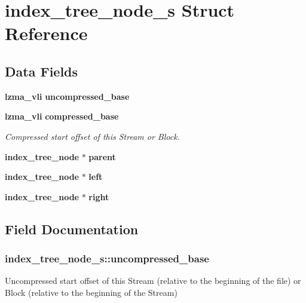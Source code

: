 \section{index\-\_\-tree\-\_\-node\-\_\-s Struct Reference}
\label{structindex__tree__node__s}
\subsection*{Data Fields}
\begin{DoxyCompactItemize}
\item 
{\bf lzma\-\_\-vli} {\bf uncompressed\-\_\-base}
\item 
{\bf lzma\-\_\-vli} {\bf compressed\-\_\-base}
\begin{DoxyCompactList}\small\item\em Compressed start offset of this Stream or Block. \end{DoxyCompactList}\item 
{\bf index\-\_\-tree\-\_\-node} $\ast$ {\bfseries parent}\label{structindex__tree__node__s_a6d682099a97742fde2b70dbb4043b943}

\item 
{\bf index\-\_\-tree\-\_\-node} $\ast$ {\bfseries left}\label{structindex__tree__node__s_a638db95808d3748f92226352c7a62435}

\item 
{\bf index\-\_\-tree\-\_\-node} $\ast$ {\bfseries right}\label{structindex__tree__node__s_a481731822e8073ba8db151e7baa101cc}

\end{DoxyCompactItemize}


\subsection{Field Documentation}
\subsubsection[{uncompressed\-\_\-base}]{ index\-\_\-tree\-\_\-node\-\_\-s\-::uncompressed\-\_\-base}\label{structindex__tree__node__s_a16b23fdd5d86576ba3c8b0be7e693f0e}
Uncompressed start offset of this Stream (relative to the beginning of the file) or Block (relative to the beginning of the Stream) 


